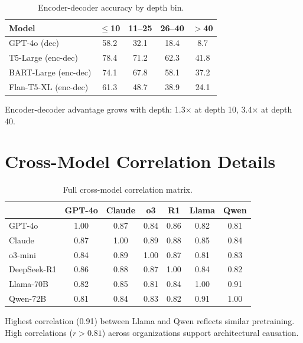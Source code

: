 \documentclass{article}
\theoremstyle{plain}
\theoremstyle{definition}
\theoremstyle{remark}
\begin{document}
\begin{table}[h]
\centering
\caption{Encoder-decoder accuracy by depth bin.}
\label{tab:enc_dec_depth}
\small
\begin{tabular}{@{}lcccc@{}}
\toprule
\textbf{Model} & \textbf{$\leq$10} & \textbf{11--25} & \textbf{26--40} & \textbf{$>$40} \\
\midrule
GPT-4o (dec) & 58.2 & 32.1 & 18.4 & 8.7 \\
T5-Large (enc-dec) & 78.4 & 71.2 & 62.3 & 41.8 \\
BART-Large (enc-dec) & 74.1 & 67.8 & 58.1 & 37.2 \\
Flan-T5-XL (enc-dec) & 61.3 & 48.7 & 38.9 & 24.1 \\
\bottomrule
\end{tabular}
\end{table}

Encoder-decoder advantage grows with depth: 1.3$\times$ at depth 10, 3.4$\times$ at depth 40.


\section{Cross-Model Correlation Details}
\label{app:crossmodel}

\begin{table}[h]
\centering
\caption{Full cross-model correlation matrix.}
\label{tab:crossmodel_full}
\small
\begin{tabular}{@{}lcccccc@{}}
\toprule
& \textbf{GPT-4o} & \textbf{Claude} & \textbf{o3} & \textbf{R1} & \textbf{Llama} & \textbf{Qwen} \\
\midrule
GPT-4o & 1.00 & 0.87 & 0.84 & 0.86 & 0.82 & 0.81 \\
Claude & 0.87 & 1.00 & 0.89 & 0.88 & 0.85 & 0.84 \\
o3-mini & 0.84 & 0.89 & 1.00 & 0.87 & 0.81 & 0.83 \\
DeepSeek-R1 & 0.86 & 0.88 & 0.87 & 1.00 & 0.84 & 0.82 \\
Llama-70B & 0.82 & 0.85 & 0.81 & 0.84 & 1.00 & 0.91 \\
Qwen-72B & 0.81 & 0.84 & 0.83 & 0.82 & 0.91 & 1.00 \\
\bottomrule
\end{tabular}
\end{table}

Highest correlation (0.91) between Llama and Qwen reflects similar pretraining. High correlations ($r > 0.81$) across organizations support architectural causation.
\end{document}
